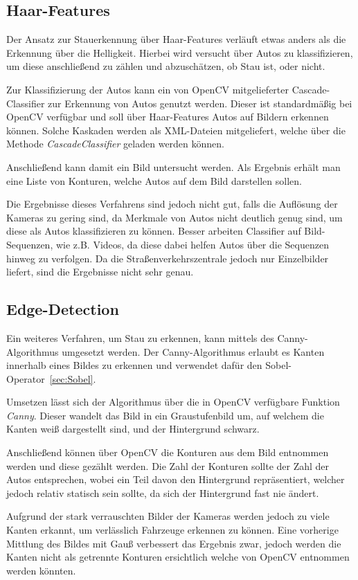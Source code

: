\subsection{Haar-Features}
Der Ansatz zur Stauerkennung über Haar-Features verläuft etwas anders als die Erkennung über die Helligkeit.
Hierbei wird versucht über Autos zu klassifizieren, um diese anschließend zu zählen und abzuschätzen, ob Stau ist, oder nicht.

Zur Klassifizierung der Autos kann ein von OpenCV mitgelieferter Cascade-Classifier zur Erkennung von Autos genutzt werden.
Dieser ist standardmäßig bei OpenCV verfügbar und soll über Haar-Features Autos auf Bildern erkennen können.
Solche Kaskaden werden als XML-Dateien mitgeliefert, welche über die Methode {\em CascadeClassifier} geladen werden können.

Anschließend kann damit ein Bild untersucht werden. Als Ergebnis erhält man eine Liste von Konturen, welche Autos auf dem Bild darstellen sollen.

Die Ergebnisse dieses Verfahrens sind jedoch nicht gut, falls die Auflösung der Kameras zu gering sind, da Merkmale von Autos nicht deutlich genug sind, um diese als Autos klassifizieren zu können.
Besser arbeiten Classifier auf Bild-Sequenzen, wie z.B. Videos, da diese dabei helfen Autos über die Sequenzen hinweg zu verfolgen.
Da die Straßenverkehrszentrale jedoch nur Einzelbilder liefert, sind die Ergebnisse nicht sehr genau.

\subsection{Edge-Detection}
Ein weiteres Verfahren, um Stau zu erkennen, kann mittels des Canny-Algorithmus umgesetzt werden.
Der Canny-Algorithmus erlaubt es Kanten innerhalb eines Bildes zu erkennen und verwendet dafür den Sobel-Operator~\ref{sec:Sobel}.

Umsetzen lässt sich der Algorithmus über die in OpenCV verfügbare Funktion {\em Canny}.
Dieser wandelt das Bild in ein Graustufenbild um, auf welchem die Kanten weiß dargestellt sind, und der Hintergrund schwarz.

Anschließend können über OpenCV die Konturen aus dem Bild entnommen werden und diese gezählt werden.
Die Zahl der Konturen sollte der Zahl der Autos entsprechen, wobei ein Teil davon den Hintergrund repräsentiert, welcher jedoch relativ statisch sein sollte, da sich der Hintergrund fast nie ändert.

Aufgrund der stark verrauschten Bilder der Kameras werden jedoch zu viele Kanten erkannt, um verlässlich Fahrzeuge erkennen zu können.
Eine vorherige Mittlung des Bildes mit Gauß verbessert das Ergebnis zwar, jedoch werden die Kanten nicht als getrennte Konturen ersichtlich welche von OpenCV entnommen werden könnten.
	
